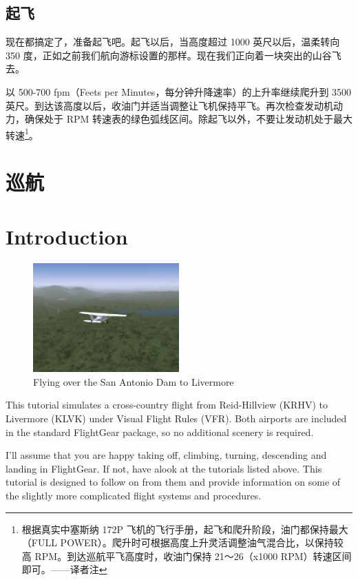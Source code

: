 \subsection{起飞}

现在都搞定了，准备起飞吧。起飞以后，当高度超过 1000 英尺以后，温柔转向 350 度，正如之前我们航向游标设置的那样。现在我们正向着一块突出的山谷飞去。

以 500-700 fpm（Feets per Minutes，每分钟升降速率）的上升率继续爬升到 3500 英尺。到达该高度以后，收油门并适当调整让飞机保持平飞。再次检查发动机动力，确保处于 RPM 转速表的绿色弧线区间。除起飞以外，不要让发动机处于最大转速\footnote{根据真实中塞斯纳 172P 飞机的飞行手册，起飞和爬升阶段，油门都保持最大（FULL POWER）。爬升时可根据高度上升灵活调整油气混合比，以保持较高 RPM。到达巡航平飞高度时，收油门保持 21～26（x1000 RPM）转速区间即可。——译者注}。

\section{巡航}


\iffalse
\section{Introduction}

\begin{figure}[!htp]
\centering
\includegraphics[width=0.5\textwidth]{antonio2}
\caption{Flying over the San Antonio Dam to Livermore}
\end{figure}

This tutorial simulates a cross-country flight from Reid-Hillview (KRHV) to
Livermore (KLVK) under Visual Flight Rules (VFR). Both airports are
included in the standard FlightGear package, so no additional scenery is required.

I'll assume that you are happy taking off, climbing, turning, descending
and landing in FlightGear. If not, have alook at the tutorials listed above.
This tutorial is designed to follow on from them and provide information on
some of the slightly more complicated flight systems and procedures.

